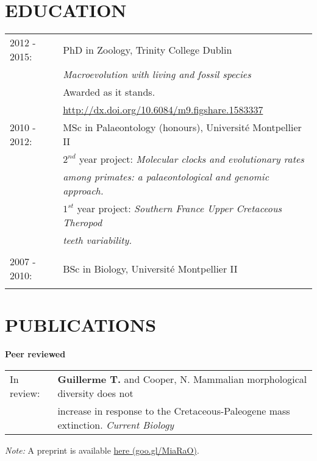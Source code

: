 \documentclass[10pt,a4paper]{article}
\begin{document}
{%
\section{EDUCATION}
\raggedright
\begin{tabular}{ll} 
2012 - 2015: & PhD in Zoology, Trinity College Dublin\\
& \textit{Macroevolution with living and fossil species} \\
& Awarded as it stands. \\
& \href{http://figshare.com/articles/Macroevolution_with_living_and_fossil_species/1583337}{http://dx.doi.org/10.6084/m9.figshare.1583337} \\
2010 - 2012: & MSc in Palaeontology (honours), Universit\'{e} Montpellier II\\
& $2^{nd}$ year project: \textit{Molecular clocks and evolutionary rates}\\
& \textit{among primates: a palaeontological and genomic approach.} \\
& $1^{st}$ year project: \textit{Southern France Upper Cretaceous Theropod}\\
& \textit{teeth variability.} \\
& \\
2007 - 2010: & BSc in Biology, Universit\'{e} Montpellier II\\
& \\
\end{tabular}

\section{PUBLICATIONS}
\raggedright\textbf{Peer reviewed}\\[1.5ex]
\begin{tabular}{ll}
In review: & \textbf{Guillerme T.} and Cooper, N. Mammalian morphological diversity does not\\
& increase in response to the Cretaceous-Paleogene mass extinction. \textit{Current Biology}\\
\end{tabular}
\textit{Note:} A preprint is available \href{https://goo.gl/MiaRaO}{here (goo.gl/MiaRaO)}. \\ 

}
\end{document}
